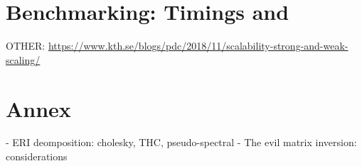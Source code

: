 \documentclass[a4paper,12pt]{article}
\begin{document}


\part{Benchmarking: Timings and }

OTHER: \url{https://www.kth.se/blogs/pdc/2018/11/scalability-strong-and-weak-scaling/}

\part{Annex}

- ERI deomposition: cholesky, THC, pseudo-spectral
- The evil matrix inversion: considerations
\end{document}

